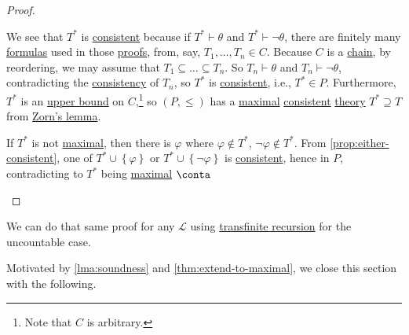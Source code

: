 \begin{proof}
\begin{explanation}
		We see that \(T^{\ast} \) is \hyperref[def:consistent]{consistent} because if \(T^{\ast} \vdash \theta \) and \(T^{\ast} \vdash \lnot \theta \), there are finitely many \hyperref[def:formula]{formulas} used in those \hyperref[def:proof]{proofs}, from, say, \(T_1, \ldots , T_n \in C\). Because \(C\) is a \hyperref[def:chain]{chain}, by reordering, we may assume that \(T_1 \subseteq \ldots \subseteq T_n\). So \(T_n \vdash \theta \) and \(T_n \vdash \lnot \theta \), contradicting the \hyperref[def:consistent]{consistency} of \(T_n\), so \(T^{\ast} \) is \hyperref[def:consistent]{consistent}, i.e., \(T^{\ast} \in P\). Furthermore, \(T^{\ast} \) is an \hyperref[def:upper-bound]{upper bound} on \(C\),\footnote{Note that \(C\) is arbitrary.} so \((P, \leq )\) has a \hyperref[def:POS-maximal]{maximal} \hyperref[def:consistent]{consistent} \hyperref[def:theory]{theory} \(T^{\ast} \supseteq T \) from \hyperref[thm:Zorn]{Zorn's lemma}.

		If \(T^{\ast} \) is not \hyperref[def:maximal]{maximal}, then there is \(\varphi \) where \(\varphi \notin T^{\ast} \), \(\lnot \varphi \notin T^{\ast} \). From \autoref{prop:either-consistent}, one of \(T^{\ast} \cup \left\{ \varphi  \right\} \) or \(T^{\ast} \cup \left\{ \lnot \varphi  \right\} \) is \hyperref[def:consistent]{consistent}, hence in \(P\), contradicting to \(T^{\ast} \) being \hyperref[def:POS-maximal]{maximal} \(\conta\)
	\end{explanation}
\end{proof}

\begin{remark}
	We can do that same proof for any \(\mathcal{L} \) using \href{https://en.wikipedia.org/wiki/Transfinite_induction}{transfinite recursion} for the uncountable case.
\end{remark}

Motivated by \autoref{lma:soundness} and \autoref{thm:extend-to-maximal}, we close this section with the following.

